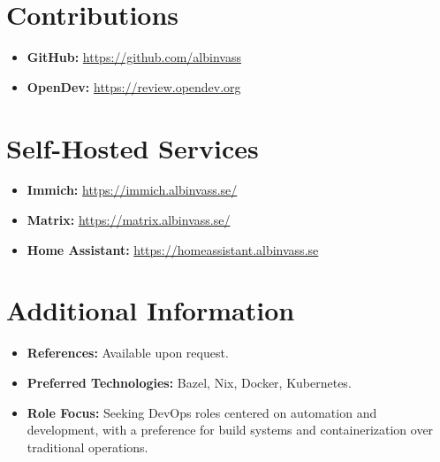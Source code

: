 \documentclass[11pt,a4paper]{article}
\begin{document}
\section{Contributions}
\begin{itemize}[leftmargin=*]
    \item \textbf{GitHub:} \href{https://github.com/albinvass}{https://github.com/albinvass}
    \item \textbf{OpenDev:} \href{https://review.opendev.org/q/owner:albin\_vass}{https://review.opendev.org}
\end{itemize}

\section{Self-Hosted Services}
\begin{itemize}[leftmargin=*]
    \item \textbf{Immich:} \href{https://immich.albinvass.se/}{https://immich.albinvass.se/}
    \item \textbf{Matrix:} \href{https://matrix.albinvass.se/}{https://matrix.albinvass.se/}
    \item \textbf{Home Assistant:} \href{https://homeassistant.albinvass.se}{https://homeassistant.albinvass.se}
\end{itemize}

\section{Additional Information}
\begin{itemize}[leftmargin=*]
    \item \textbf{References:} Available upon request.
    \item \textbf{Preferred Technologies:} Bazel, Nix, Docker, Kubernetes.
    \item \textbf{Role Focus:} Seeking DevOps roles centered on automation and development, with a preference for build systems and containerization over traditional operations.
\end{itemize}
\end{document}
